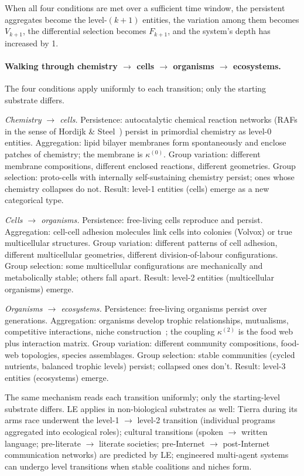 \documentclass[journal]{IEEEtran}
\theoremstyle{plain}
\theoremstyle{definition}
\theoremstyle{plain}
\begin{document}
When all four conditions are met over a sufficient time window, the
persistent aggregates become the level-$(k{+}1)$ entities, the
variation among them becomes $V_{k+1}$, the differential selection
becomes $F_{k+1}$, and the system's depth has increased by 1.

\paragraph{Walking through chemistry $\to$ cells $\to$ organisms $\to$
ecosystems.} The four conditions apply uniformly to each transition;
only the starting substrate differs.

\emph{Chemistry $\to$ cells.}
Persistence: autocatalytic chemical reaction networks (RAFs in the
sense of Hordijk \& Steel~\cite{hordijk2004raf,hordijk2015algorithms})
persist in primordial chemistry as level-0 entities.
Aggregation: lipid bilayer membranes form spontaneously and enclose
patches of chemistry; the membrane is $\kappa^{(0)}$.
Group variation: different membrane compositions, different enclosed
reactions, different geometries.
Group selection: proto-cells with internally self-sustaining
chemistry persist; ones whose chemistry collapses do not. Result:
level-1 entities (cells) emerge as a new categorical type.

\emph{Cells $\to$ organisms.}
Persistence: free-living cells reproduce and persist.
Aggregation: cell-cell adhesion molecules link cells into colonies
(Volvox) or true multicellular structures.
Group variation: different patterns of cell adhesion, different
multicellular geometries, different division-of-labour configurations.
Group selection: some multicellular configurations are mechanically
and metabolically stable; others fall apart. Result: level-2 entities
(multicellular organisms) emerge.

\emph{Organisms $\to$ ecosystems.}
Persistence: free-living organisms persist over generations.
Aggregation: organisms develop trophic relationships, mutualisms,
competitive interactions, niche construction~\cite{odlingsmee2003niche};
the coupling $\kappa^{(2)}$ is the food web plus interaction matrix.
Group variation: different community compositions, food-web
topologies, species assemblages.
Group selection: stable communities (cycled nutrients, balanced
trophic levels) persist; collapsed ones don't. Result: level-3
entities (ecosystems) emerge.

The same mechanism reads each transition uniformly; only the
starting-level substrate differs. LE applies in non-biological
substrates as well: Tierra during its arms race underwent the
level-1 $\to$ level-2 transition (individual programs aggregated into
ecological roles); cultural transitions (spoken $\to$ written
language; pre-literate $\to$ literate societies; pre-Internet $\to$
post-Internet communication networks) are predicted by LE; engineered
multi-agent systems can undergo level transitions when stable
coalitions and niches form.
\end{document}
